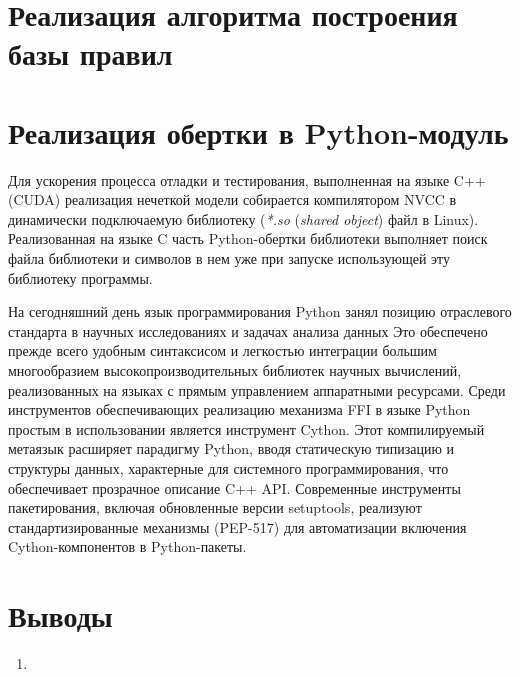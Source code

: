 \section{Реализация алгоритма построения базы правил}

\section{Реализация обертки в Python-модуль}

Для ускорения процесса отладки и тестирования, выполненная на языке C++ (CUDA) реализация нечеткой модели собирается компилятором NVCC в динамически подключаемую библиотеку (\textit{*.so} (\textit{shared object}) файл в Linux). Реализованная на языке C часть Python-обертки библиотеки выполняет поиск файла библиотеки и символов в нем уже при запуске использующей эту библиотеку программы.

На сегодняшний день язык программирования Python занял позицию отраслевого стандарта в научных исследованиях и задачах анализа данных  Это обеспечено прежде всего удобным синтаксисом и легкостью интеграции большим многообразием высокопроизводительных библиотек научных вычислений, реализованных на языках с прямым управлением аппаратными ресурсами. Среди инструментов обеспечивающих реализацию механизма FFI в языке Python простым в использовании является инструмент Cython. Этот компилируемый метаязык расширяет парадигму Python, вводя статическую типизацию и структуры данных, характерные для системного программирования, что обеспечивает прозрачное описание C++ API. Современные инструменты пакетирования, включая обновленные версии setuptools, реализуют стандартизированные механизмы (PEP-517) для автоматизации включения Cython-компонентов в Python-пакеты.

\section{Выводы}

\begin{enumerate}
	\item 
\end{enumerate}

